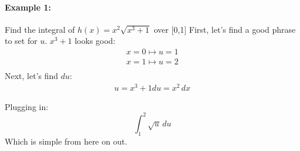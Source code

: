 \documentclass[../revisedmain.tex]{subfiles}
\begin{document}
	\paragraph{Example 1:} Find the integral of $h(x)=x^2\sqrt{x^3+1}$ over [0,1]
	First, let's find a good phrase to set for $u$. $x^3+1$ looks good:
	\begin{gather*}
		x=0\mapsto u=1\\
		x=1\mapsto u=2\\
	\end{gather*}
	Next, let's find $du$:
	\begin{gather*}
	u=x^3+1
	du=x^2\, dx
	\end{gather*}

Plugging in:
	\[
	\int_{1}^{2}\sqrt{u}\, du
	\]
	Which is simple from here on out.\\
\end{document}
